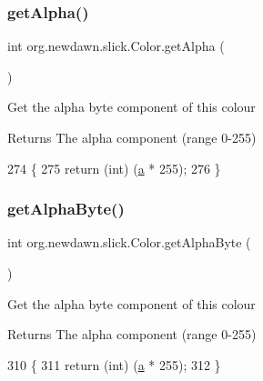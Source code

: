 \subsubsection{\texorpdfstring{get\+Alpha()}{getAlpha()}}
{\footnotesize\ttfamily int org.\+newdawn.\+slick.\+Color.\+get\+Alpha (\begin{DoxyParamCaption}{ }\end{DoxyParamCaption})\hspace{0.3cm}{\ttfamily [inline]}}

Get the alpha byte component of this colour

\begin{DoxyReturn}{Returns}
The alpha component (range 0-\/255) 
\end{DoxyReturn}

\begin{DoxyCode}
274                           \{
275         \textcolor{keywordflow}{return} (\textcolor{keywordtype}{int}) (\mbox{\hyperlink{classorg_1_1newdawn_1_1slick_1_1_color_ab9288c822ff7614a77c887eb8c2595a7}{a}} * 255);
276     \}
\end{DoxyCode}
\mbox{\label{classorg_1_1newdawn_1_1slick_1_1_color_a7ee660333e53bf7fdad0afd82c0628cc}} 
\subsubsection{\texorpdfstring{get\+Alpha\+Byte()}{getAlphaByte()}}
{\footnotesize\ttfamily int org.\+newdawn.\+slick.\+Color.\+get\+Alpha\+Byte (\begin{DoxyParamCaption}{ }\end{DoxyParamCaption})\hspace{0.3cm}{\ttfamily [inline]}}

Get the alpha byte component of this colour

\begin{DoxyReturn}{Returns}
The alpha component (range 0-\/255) 
\end{DoxyReturn}

\begin{DoxyCode}
310                               \{
311         \textcolor{keywordflow}{return} (\textcolor{keywordtype}{int}) (\mbox{\hyperlink{classorg_1_1newdawn_1_1slick_1_1_color_ab9288c822ff7614a77c887eb8c2595a7}{a}} * 255);
312     \}
\end{DoxyCode}
\mbox{\label{classorg_1_1newdawn_1_1slick_1_1_color_a56e59960da3578263fcdb513ca64001e}} 
